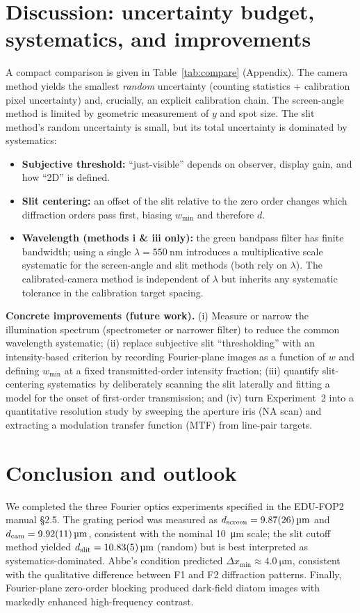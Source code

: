 \documentclass[10pt,twocolumn]{article}
\begin{document}
\section{Discussion: uncertainty budget, systematics, and improvements}
A compact comparison is given in Table~\ref{tab:compare} (Appendix). The camera method yields the smallest \emph{random} uncertainty (counting statistics + calibration pixel uncertainty) and, crucially, an explicit calibration chain. The screen-angle method is limited by geometric measurement of $y$ and spot size. The slit method's random uncertainty is small, but its total uncertainty is dominated by systematics:
\begin{itemize}
\item \textbf{Subjective threshold:} ``just-visible'' depends on observer, display gain, and how ``2D'' is defined.
\item \textbf{Slit centering:} an offset of the slit relative to the zero order changes which diffraction orders pass first, biasing $w_{\min}$ and therefore $d$.
\item \textbf{Wavelength (methods i \& iii only):} the green bandpass filter has finite bandwidth; using a single $\lambda=\SI{550}{\nano\meter}$ introduces a multiplicative scale systematic for the screen-angle and slit methods (both rely on $\lambda$). The calibrated-camera method is independent of $\lambda$ but inherits any systematic tolerance in the calibration target spacing.
\end{itemize}

\textbf{Concrete improvements (future work).} (i) Measure or narrow the illumination spectrum (spectrometer or narrower filter) to reduce the common wavelength systematic; (ii) replace subjective slit ``thresholding'' with an intensity-based criterion by recording Fourier-plane images as a function of $w$ and defining $w_{\min}$ at a fixed transmitted-order intensity fraction; (iii) quantify slit-centering systematics by deliberately scanning the slit laterally and fitting a model for the onset of first-order transmission; and (iv) turn Experiment~2 into a quantitative resolution study by sweeping the aperture iris (NA scan) and extracting a modulation transfer function (MTF) from line-pair targets.

\section{Conclusion and outlook}
We completed the three Fourier optics experiments specified in the EDU-FOP2 manual \S2.5. The grating period was measured as $d_{\mathrm{screen}}=\SI{9.87\pm0.26}{\micro\meter}$ and $d_{\mathrm{cam}}=\SI{9.92\pm0.11}{\micro\meter}$, consistent with the nominal \SI{10}{\micro\meter} scale; the slit cutoff method yielded $d_{\mathrm{slit}}=\SI{10.83\pm0.05}{\micro\meter}$ (random) but is best interpreted as systematics-dominated. Abbe's condition predicted $\Delta x_{\min}\approx\SI{4.0}{\micro\meter}$, consistent with the qualitative difference between F1 and F2 diffraction patterns. Finally, Fourier-plane zero-order blocking produced dark-field diatom images with markedly enhanced high-frequency contrast.
\end{document}
